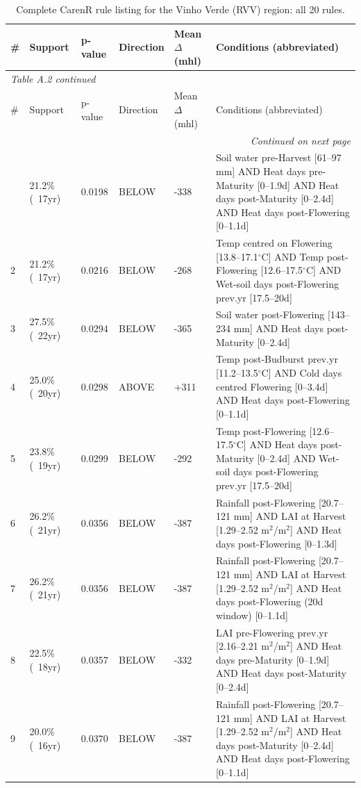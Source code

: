 {\scriptsize
\begin{longtable}{p{0.4cm}|p{1.5cm}|p{1.2cm}|p{1.3cm}|p{1.5cm}|p{8.2cm}}
  \caption{Complete CarenR rule listing for the Vinho Verde (RVV) region: all 20 rules.}\label{tab:appa_2}\\
  \toprule
  \# & Support & p-value & Direction & Mean $\Delta$ (mhl) & Conditions (abbreviated) \\
  \midrule
  \endfirsthead
  \multicolumn{6}{l}{\small\textit{Table A.2 continued}}\\
  \toprule
  \# & Support & p-value & Direction & Mean $\Delta$ (mhl) & Conditions (abbreviated) \\
  \midrule
  \endhead
  \midrule
  \multicolumn{6}{r}{\small\textit{Continued on next page}}\\
  \endfoot
  \bottomrule
  \endlastfoot
  1 & 21.2\% (~17yr) & 0.0198 & BELOW & -338 & Soil water pre-Harvest [61--97 mm] AND Heat days pre-Maturity [0--1.9d] AND Heat days post-Maturity [0--2.4d] AND Heat days post-Flowering [0--1.1d] \\
  2 & 21.2\% (~17yr) & 0.0216 & BELOW & -268 & Temp centred on Flowering [13.8--17.1$^\circ$C] AND Temp post-Flowering [12.6--17.5$^\circ$C] AND Wet-soil days post-Flowering prev.yr [17.5--20d] \\
  3 & 27.5\% (~22yr) & 0.0294 & BELOW & -365 & Soil water post-Flowering [143--234 mm] AND Heat days post-Maturity [0--2.4d] \\
  4 & 25.0\% (~20yr) & 0.0298 & ABOVE & +311 & Temp post-Budburst prev.yr [11.2--13.5$^\circ$C] AND Cold days centred Flowering [0--3.4d] AND Heat days post-Flowering [0--1.1d] \\
  5 & 23.8\% (~19yr) & 0.0299 & BELOW & -292 & Temp post-Flowering [12.6--17.5$^\circ$C] AND Heat days post-Maturity [0--2.4d] AND Wet-soil days post-Flowering prev.yr [17.5--20d] \\
  6 & 26.2\% (~21yr) & 0.0356 & BELOW & -387 & Rainfall post-Flowering [20.7--121 mm] AND LAI at Harvest [1.29--2.52 m$^2$/m$^2$] AND Heat days post-Flowering [0--1.3d] \\
  7 & 26.2\% (~21yr) & 0.0356 & BELOW & -387 & Rainfall post-Flowering [20.7--121 mm] AND LAI at Harvest [1.29--2.52 m$^2$/m$^2$] AND Heat days post-Flowering (20d window) [0--1.1d] \\
  8 & 22.5\% (~18yr) & 0.0357 & BELOW & -332 & LAI pre-Flowering prev.yr [2.16--2.21 m$^2$/m$^2$] AND Heat days pre-Maturity [0--1.9d] AND Heat days post-Maturity [0--2.4d] \\
  9 & 20.0\% (~16yr) & 0.0370 & BELOW & -387 & Rainfall post-Flowering [20.7--121 mm] AND LAI at Harvest [1.29--2.52 m$^2$/m$^2$] AND Heat days post-Maturity [0--2.4d] AND Heat days post-Flowering [0--1.1d] \\

\end{longtable}}
